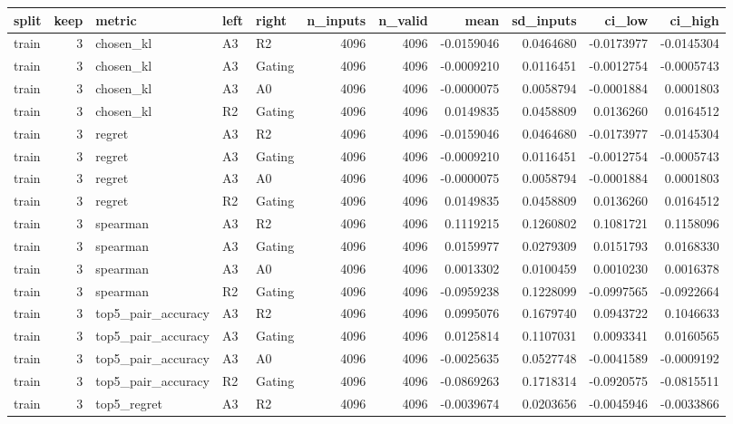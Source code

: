 \begin{tabular}{lrlllrrrrrr}
\toprule
split & keep & metric & left & right & n_inputs & n_valid & mean & sd_inputs & ci_low & ci_high \\
\midrule
train & 3 & chosen_kl & A3 & R2 & 4096 & 4096 & -0.0159046 & 0.0464680 & -0.0173977 & -0.0145304 \\
train & 3 & chosen_kl & A3 & Gating & 4096 & 4096 & -0.0009210 & 0.0116451 & -0.0012754 & -0.0005743 \\
train & 3 & chosen_kl & A3 & A0 & 4096 & 4096 & -0.0000075 & 0.0058794 & -0.0001884 & 0.0001803 \\
train & 3 & chosen_kl & R2 & Gating & 4096 & 4096 & 0.0149835 & 0.0458809 & 0.0136260 & 0.0164512 \\
train & 3 & regret & A3 & R2 & 4096 & 4096 & -0.0159046 & 0.0464680 & -0.0173977 & -0.0145304 \\
train & 3 & regret & A3 & Gating & 4096 & 4096 & -0.0009210 & 0.0116451 & -0.0012754 & -0.0005743 \\
train & 3 & regret & A3 & A0 & 4096 & 4096 & -0.0000075 & 0.0058794 & -0.0001884 & 0.0001803 \\
train & 3 & regret & R2 & Gating & 4096 & 4096 & 0.0149835 & 0.0458809 & 0.0136260 & 0.0164512 \\
train & 3 & spearman & A3 & R2 & 4096 & 4096 & 0.1119215 & 0.1260802 & 0.1081721 & 0.1158096 \\
train & 3 & spearman & A3 & Gating & 4096 & 4096 & 0.0159977 & 0.0279309 & 0.0151793 & 0.0168330 \\
train & 3 & spearman & A3 & A0 & 4096 & 4096 & 0.0013302 & 0.0100459 & 0.0010230 & 0.0016378 \\
train & 3 & spearman & R2 & Gating & 4096 & 4096 & -0.0959238 & 0.1228099 & -0.0997565 & -0.0922664 \\
train & 3 & top5_pair_accuracy & A3 & R2 & 4096 & 4096 & 0.0995076 & 0.1679740 & 0.0943722 & 0.1046633 \\
train & 3 & top5_pair_accuracy & A3 & Gating & 4096 & 4096 & 0.0125814 & 0.1107031 & 0.0093341 & 0.0160565 \\
train & 3 & top5_pair_accuracy & A3 & A0 & 4096 & 4096 & -0.0025635 & 0.0527748 & -0.0041589 & -0.0009192 \\
train & 3 & top5_pair_accuracy & R2 & Gating & 4096 & 4096 & -0.0869263 & 0.1718314 & -0.0920575 & -0.0815511 \\
train & 3 & top5_regret & A3 & R2 & 4096 & 4096 & -0.0039674 & 0.0203656 & -0.0045946 & -0.0033866 \\

\end{tabular}
